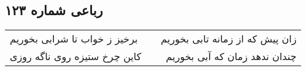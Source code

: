\begin{center}
\section*{رباعی شماره ۱۲۳}
\label{sec:sh123}
\begin{longtable}{l p{0.5cm} r}
برخیز ز خواب تا شرابی بخوریم
&&
زان پیش که از زمانه تابی بخوریم
\\
کاین چرخ ستیزه روی ناگه روزی
&&
چندان ندهد زمان که آبی بخوریم
\\
\end{longtable}
\end{center}
